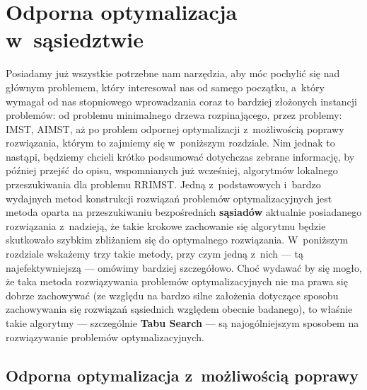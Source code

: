 \chapter{Odporna optymalizacja w~sąsiedztwie}\label{ch:localSearch}
\thispagestyle{chapterBeginStyle}

Posiadamy już wszystkie potrzebne nam narzędzia, aby móc pochylić się nad głównym problemem, który interesował nas od samego początku, a~który wymagał od nas stopniowego wprowadzania coraz to bardziej złożonych instancji problemów: od problemu minimalnego drzewa rozpinającego, przez problemy: \textsc{IMST}, \textsc{AIMST}, aż po problem odpornej optymalizacji z~możliwością poprawy rozwiązania, którym to zajmiemy się w~poniższym rozdziale. Nim jednak to nastąpi, będziemy chcieli krótko podsumować dotychczas zebrane informację, by później przejść do opisu, wspomnianych już wcześniej, algorytmów lokalnego przeszukiwania dla problemu \textsc{RRIMST}. Jedną z~podstawowych i~bardzo wydajnych metod konstrukcji rozwiązań problemów optymalizacyjnych jest metoda oparta na przeszukiwaniu bezpośrednich \textbf{sąsiadów} aktualnie posiadanego rozwiązania z~nadzieją, że takie krokowe zachowanie się algorytmu będzie skutkowało szybkim zbliżaniem się do optymalnego rozwiązania. W~poniższym rozdziale wskażemy trzy takie metody, przy czym jedną z~nich --- tą najefektywniejszą --- omówimy bardziej szczegółowo. Choć wydawać by się mogło, że taka metoda rozwiązywania problemów optymalizacyjnych nie ma prawa się dobrze zachowywać (ze względu na bardzo silne założenia dotyczące sposobu zachowywania się rozwiązań sąsiednich względem obecnie badanego), to właśnie takie algorytmy --- szczególnie \textbf{Tabu Search} --- są najogólniejszym sposobem na rozwiązywanie problemów optymalizacyjnych.

\section{Odporna optymalizacja z~możliwością poprawy}

